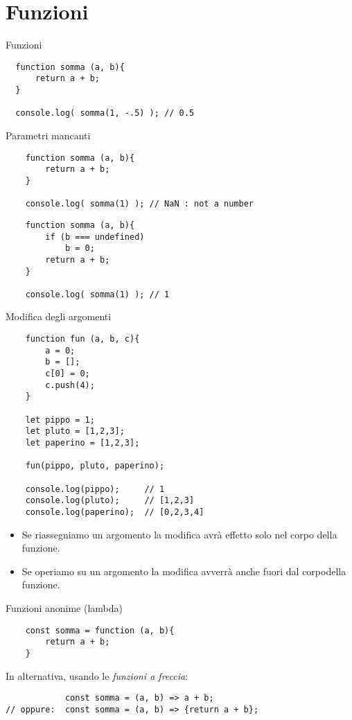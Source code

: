 \section{Funzioni}
\begin{frame}[fragile]{Funzioni}\transfade\centering
\begin{verbatim}
  function somma (a, b){
      return a + b;
  }

  console.log( somma(1, -.5) ); // 0.5
\end{verbatim}
\end{frame}

\begin{frame}[fragile]{Parametri mancanti}\transfade\centering
  \begin{verbatim}
    function somma (a, b){
        return a + b;
    }

    console.log( somma(1) ); // NaN : not a number
  \end{verbatim}
  \pause
  \begin{verbatim}
    function somma (a, b){
        if (b === undefined)
            b = 0;
        return a + b;
    }

    console.log( somma(1) ); // 1
  \end{verbatim}
\end{frame}

\begin{frame}[fragile]{Modifica degli argomenti}\transfade\centering
  \begin{verbatim}
    function fun (a, b, c){
        a = 0;
        b = [];
        c[0] = 0;
        c.push(4);
    }

    let pippo = 1;
    let pluto = [1,2,3];
    let paperino = [1,2,3];

    fun(pippo, pluto, paperino);

    console.log(pippo);     // 1
    console.log(pluto);     // [1,2,3]
    console.log(paperino);  // [0,2,3,4]
  \end{verbatim}
  \bigskip
  \begin{itemize}
    \item Se riassegniamo un argomento la modifica avrà effetto solo nel corpo della funzione.
    \item Se operiamo su un argomento la modifica avverrà anche fuori dal corpodella funzione.
  \end{itemize}
\end{frame}

\begin{frame}[fragile]{Funzioni anonime (lambda)}\transfade\centering
  \begin{verbatim}
    const somma = function (a, b){
        return a + b;
    }
  \end{verbatim}
  \pause\bigskip
  In alternativa, usando le \emph{funzioni a freccia}:
  \begin{verbatim}
            const somma = (a, b) => a + b;
// oppure:  const somma = (a, b) => {return a + b};
\end{verbatim}
\end{frame}